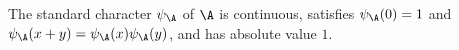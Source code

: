 The standard character $\psi_\A$ of $\A$ is continuous, satisfies $\psi_\A(0)=1$ and $\psi_\A(x+y)=\psi_\A(x)\psi_\A(y)$, and has absolute value $1$.
